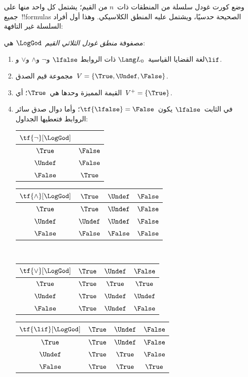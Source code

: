 \documentclass[../../../include/open-logic-section]{subfiles}
\begin{document}


وضع كورت غودل سلسلة من المنطقات ذات~$n$ من القيم؛ يشتمل كل واحد
منها على جميع~!!{formula}s الصحيحة حدسيًا، ويشتمل عليه المنطق
الكلاسيكي. وهذا أول أفراد السلسلة غير التافهة:

\begin{defn}
مصفوفة \emph{منطق غودل الثلاثي القيم}~$\LogGod$ هي:
\begin{enumerate}
  \item لغة القضايا القياسية~$\Lang L_0$ ذات الروابط
  $\lfalse$ و$\lnot$ و$\land$ و$\lor$ و$\lif$.
  \item مجموعة قيم الصدق~$V = \{\True, \Undef, \False\}$.
  \item القيمة المميزة وحدها هي~$\True$؛ أي~$V^+ = \{\True\}$.
  \item في الثابت~$\lfalse$ يكون~$\tf{\lfalse} = \False$؛ وأما
  دوال صدق سائر الروابط فتعطيها الجداول:
  \begin{center}
    \begin{tabular}{c|c}
      $\tf{\lnot}[\LogGod]$ & \\
      \hline
      $\True$ & $\False$ \\
      $\Undef$ & $\False$ \\
      $\False$ & $\True$
    \end{tabular}
    \quad
    \begin{tabular}{c|ccc}
      $\tf{\land}[\LogGod]$ & $\True$ & $\Undef$ & $\False$ \\
      \hline
      $\True$ & $\True$ & $\Undef$ & $\False$ \\
      $\Undef$ & $\Undef$ & $\Undef$ & $\False$\\
      $\False$ & $\False$ & $\False$ & $\False$
    \end{tabular}
    \\[2ex]
    \begin{tabular}{c|ccc}
      $\tf{\lor}[\LogGod]$ & $\True$ & $\Undef$ & $\False$ \\
      \hline
      $\True$ & $\True$ & $\True$ & $\True$ \\
      $\Undef$ & $\True$ & $\Undef$ & $\Undef$ \\
      $\False$ & $\True$ & $\Undef$ & $\False$
    \end{tabular}
    \quad
    \begin{tabular}{c|ccc}
      $\tf{\lif}[\LogGod]$ & $\True$ & $\Undef$ & $\False$ \\
      \hline
      $\True$ & $\True$ & $\Undef$ & $\False$ \\
      $\Undef$ & $\True$ & $\True$ & $\False$  \\
      $\False$ & $\True$ & $\True$ & $\True$
    \end{tabular}
  \end{center}
\end{enumerate}
\end{defn}
\end{document}
